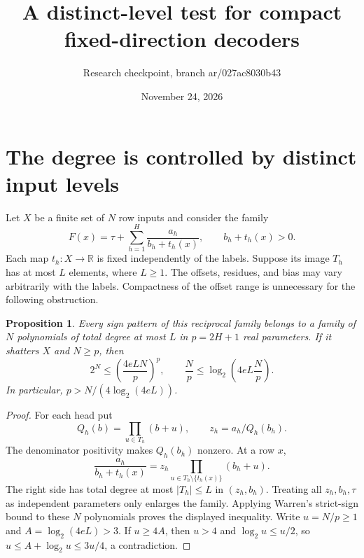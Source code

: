 \documentclass[11pt]{article}
\title{A distinct-level test for compact fixed-direction decoders}
\author{Research checkpoint, branch ar/027ac8030b43}
\date{November 24, 2026}
\newtheorem{proposition}{Proposition}
\begin{document}
\maketitle

\section{The degree is controlled by distinct input levels}

Let $X$ be a finite set of $N$ row inputs and consider the family
\[
 F(x)=\tau+\sum_{h=1}^H\frac{a_h}{b_h+t_h(x)},
 \qquad b_h+t_h(x)>0.
\]
Each map $t_h:X\to\mathbb R$ is fixed independently of the labels. Suppose
its image $T_h$ has at most $L$ elements, where $L\geq1$. The offsets,
residues, and bias may vary arbitrarily with the labels. Compactness of
the offset range is unnecessary for the following obstruction.

\begin{proposition}
Every sign pattern of this reciprocal family belongs to a family of $N$
polynomials of total degree at most $L$ in $p=2H+1$ real parameters.
If it shatters $X$ and $N\geq p$, then
\[
 2^N\leq\left(\frac{4eLN}{p}\right)^p,
 \qquad
 \frac Np\leq\log_2\left(4eL\frac Np\right).
\]
In particular, $p>N/(4\log_2(4eL))$.
\end{proposition}
\begin{proof}
For each head put
\[
 Q_h(b)=\prod_{u\in T_h}(b+u),\qquad z_h=a_h/Q_h(b_h).
\]
The denominator positivity makes $Q_h(b_h)$ nonzero. At a row $x$,
\[
 \frac{a_h}{b_h+t_h(x)}
   =z_h\prod_{u\in T_h\setminus\{t_h(x)\}}(b_h+u).
\]
The right side has total degree at most $|T_h|\leq L$ in $(z_h,b_h)$.
Treating all $z_h,b_h,\tau$ as independent parameters only enlarges the
family. Applying Warren's strict-sign bound to these $N$ polynomials
proves the displayed inequality. Write $u=N/p\geq1$ and
$A=\log_2(4eL)>3$. If $u\geq4A$, then $u>4$ and
$\log_2u\leq u/2$, so
$u\leq A+\log_2u\leq3u/4$, a contradiction.
\end{proof}
\end{document}
